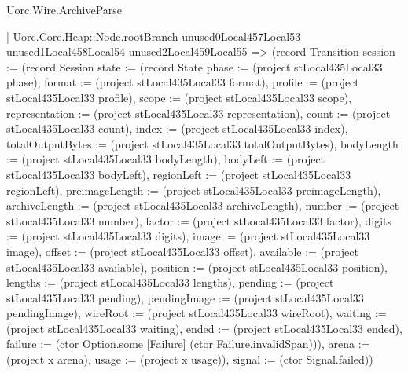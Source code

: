 \begin{lexlean}{Uorc.Wire.ArchiveParse}
\begin{semanticmodule}
{        | Uorc.Core.Heap::Node.rootBranch unused0Local457Local53 unused1Local458Local54 unused2Local459Local55 => (record Transition {session := (record Session {state := (record State {phase := (project stLocal435Local33 phase), format := (project stLocal435Local33 format), profile := (project stLocal435Local33 profile), scope := (project stLocal435Local33 scope), representation := (project stLocal435Local33 representation), count := (project stLocal435Local33 count), index := (project stLocal435Local33 index), totalOutputBytes := (project stLocal435Local33 totalOutputBytes), bodyLength := (project stLocal435Local33 bodyLength), bodyLeft := (project stLocal435Local33 bodyLeft), regionLeft := (project stLocal435Local33 regionLeft), preimageLength := (project stLocal435Local33 preimageLength), archiveLength := (project stLocal435Local33 archiveLength), number := (project stLocal435Local33 number), factor := (project stLocal435Local33 factor), digits := (project stLocal435Local33 digits), image := (project stLocal435Local33 image), offset := (project stLocal435Local33 offset), available := (project stLocal435Local33 available), position := (project stLocal435Local33 position), lengths := (project stLocal435Local33 lengths), pending := (project stLocal435Local33 pending), pendingImage := (project stLocal435Local33 pendingImage), wireRoot := (project stLocal435Local33 wireRoot), waiting := (project stLocal435Local33 waiting), ended := (project stLocal435Local33 ended), failure := (ctor Option.some [Failure] (ctor Failure.invalidSpan))}), arena := (project x arena), usage := (project x usage)}), signal := (ctor Signal.failed)})
}
\end{semanticmodule}
\end{lexlean}
